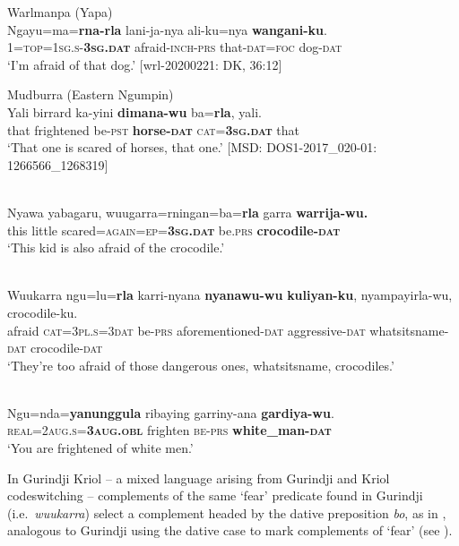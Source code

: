 \documentclass[output=paper,colorlinks,citecolor=brown]{langscibook}
\begin{document}
\ea 
\textnormal{Warlmanpa (Yapa)} \\
\gll Ngayu=ma=\textbf{rna-rla} lani-ja-nya ali-ku=nya \textbf{wangani-ku}. \\
1=\textsc{top=1sg.s-\textbf{3sg.dat}} afraid-\textsc{inch-prs} that-\textsc{dat=foc} dog-\textsc{dat} \\
\glt `I'm afraid of that dog.' $[$wrl-20200221: DK, 36:12$]$
\label{ex:bro34}
\z

\ea 
\textnormal{Mudburra (Eastern Ngumpin)} \\
\gll Yali birrard ka-yini \textbf{dimana-wu} ba=\textbf{rla}, yali. \\
that frightened be-\textsc{pst} \textbf{horse-\textsc{dat}} \textsc{cat=\textbf{3sg.dat}} that \\
\glt `That one is scared of horses, that one.' $[$MSD: DOS1-2017\_020-01: 1266566\_1268319$]$
\label{ex:bro35}
\z

\ea 
{} \\
\gll Nyawa yabagaru, wuugarra=rningan=ba=\textbf{rla} garra \textbf{warrija-wu.} \\
this little scared=\textsc{again=ep=\textbf{3sg.dat}} be.\textsc{prs} \textbf{crocodile-\textsc{dat}} \\
\glt `This kid is also afraid of the crocodile.' 
\label{ex:bro36}
\z

\ea 
{} \\
\gll Wuukarra ngu=lu=\textbf{rla} karri-nyana \textbf{nyanawu-wu} \textbf{kuliyan-ku}, nyampayirla-wu, crocodile-ku. \\
afraid \textsc{cat=3pl.s=3dat} be-\textsc{prs} aforementioned-\textsc{dat} aggressive-\textsc{dat} whatsitsname-\textsc{dat} crocodile-\textsc{dat} \\
\glt `They're too afraid of those dangerous ones, whatsitsname, crocodiles.'
\label{ex:bro37}
\z

\ea 
{} \\
\gll Ngu=nda=\textbf{yanunggula}	ribaying	garriny-ana	\textbf{gardiya-wu}. \\
\textsc{real=2aug.s=\textbf{3aug.obl}} frighten \textsc{be-prs} \textbf{white\_man-\textsc{dat}} \\
\glt `You are frightened of white men.' 
\label{ex:bro38}
\z

\largerpage
 In Gurindji Kriol -- a mixed language arising from Gurindji and Kriol codeswitching \citep{mcconvell_gurindji_2005} -- complements of the same `fear' predicate found in Gurindji (i.e.\  \textit{wuukarra}) select a complement headed by the dative preposition \textit{bo}, as in , analogous to Gurindji using the dative case to mark complements of `fear' (see \cite[430--431]{meakins_case-marking_2008}).
\end{document}
